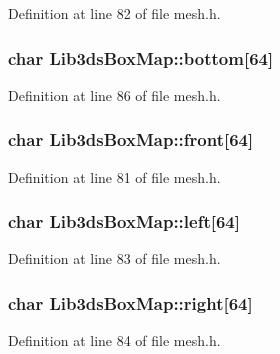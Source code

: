 Definition at line 82 of file mesh.\-h.

\hypertarget{struct_lib3ds_box_map_a986713bc450255c6fbbf55865284530d}{
\subsubsection[{bottom}]{\setlength{\rightskip}{0pt plus 5cm}char Lib3ds\-Box\-Map\-::bottom\mbox{[}64\mbox{]}}}\label{struct_lib3ds_box_map_a986713bc450255c6fbbf55865284530d}


Definition at line 86 of file mesh.\-h.

\hypertarget{struct_lib3ds_box_map_ac5fbb670246fe7b165d547cc46cdd694}{
\subsubsection[{front}]{\setlength{\rightskip}{0pt plus 5cm}char Lib3ds\-Box\-Map\-::front\mbox{[}64\mbox{]}}}\label{struct_lib3ds_box_map_ac5fbb670246fe7b165d547cc46cdd694}


Definition at line 81 of file mesh.\-h.

\hypertarget{struct_lib3ds_box_map_ae7f9dc3174d3c925226923199f6e2cd4}{
\subsubsection[{left}]{\setlength{\rightskip}{0pt plus 5cm}char Lib3ds\-Box\-Map\-::left\mbox{[}64\mbox{]}}}\label{struct_lib3ds_box_map_ae7f9dc3174d3c925226923199f6e2cd4}


Definition at line 83 of file mesh.\-h.

\hypertarget{struct_lib3ds_box_map_a7cbb30ddf56d87c28185c3bed3245552}{
\subsubsection[{right}]{\setlength{\rightskip}{0pt plus 5cm}char Lib3ds\-Box\-Map\-::right\mbox{[}64\mbox{]}}}\label{struct_lib3ds_box_map_a7cbb30ddf56d87c28185c3bed3245552}


Definition at line 84 of file mesh.\-h.

